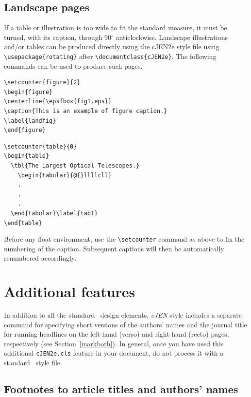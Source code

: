 \documentclass[]{cJEN2e}
\begin{document}
\subsection{Landscape pages}\label{eps}

If a table or illustration is too wide to fit the standard measure, it must be turned, with its caption, through
90$^{\circ}$ anticlockwise. Landscape illustrations and/or tables can be produced directly using the cJEN2e style
file using \verb"\usepackage{rotating}" after \verb"\documentclass{cJEN2e}". The following commands can be used
to produce such pages.
%
\begin{verbatim}
\setcounter{figure}{2}
\begin{figure}
\centerline{\epsfbox{fig1.eps}}
\caption{This is an example of figure caption.}
\label{landfig}
\end{figure}
\end{verbatim}
%
\begin{verbatim}
\setcounter{table}{0}
\begin{table}
  \tbl{The Largest Optical Telescopes.}
    \begin{tabular}{@{}llllcll}
    .
    .
    .
  \end{tabular}\label{tab1}
\end{table}
\end{verbatim}
%
Before any float environment, use the \verb"\setcounter" command
as above to fix the numbering of the caption. Subsequent captions
will then be automatically renumbered accordingly.


\section{Additional features}

In addition to all the standard \LaTeXe\ design elements, {\it cJEN} style includes a separate command for specifying short versions of the authors' names and the journal title for running headlines on the left-hand (verso) and right-hand (recto) pages, respectively (see Section~\ref{markboth}).  In general, once you have used this additional {\tt cJEN2e.cls} feature in your document, do not process it with a standard \LaTeXe\ style file.

\subsection{Footnotes to article titles and authors' names}
\end{document}
